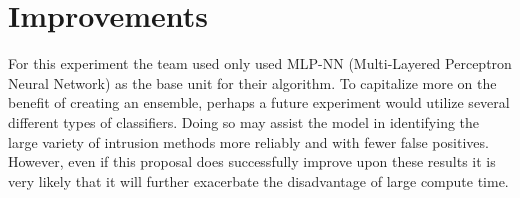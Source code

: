 \documentclass[]{article}
\begin{document}
\section{Improvements}

For this experiment the team used only used MLP-NN (Multi-Layered Perceptron Neural Network) as the base unit for their algorithm. 
To capitalize more on the benefit of creating an ensemble, perhaps a future experiment would utilize several different types of classifiers.
Doing so may assist the model in identifying the large variety of intrusion methods more reliably and with fewer false positives.
However, even if this proposal does successfully improve upon these results it is very likely that it will further exacerbate the disadvantage of large compute time.

\clearpage


\end{document}
